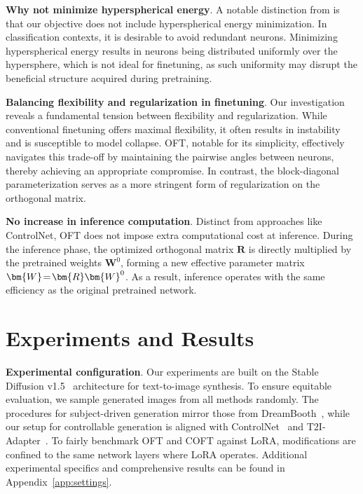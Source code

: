 \textbf{Why not minimize hyperspherical energy}. A notable distinction from \cite{liu2021orthogonal} is that our objective does not include hyperspherical energy minimization. In classification contexts, it is desirable to avoid redundant neurons. Minimizing hyperspherical energy results in neurons being distributed uniformly over the hypersphere, which is not ideal for finetuning, as such uniformity may disrupt the beneficial structure acquired during pretraining.

\textbf{Balancing flexibility and regularization in finetuning}. Our investigation reveals a fundamental tension between flexibility and regularization. While conventional finetuning offers maximal flexibility, it often results in instability and is susceptible to model collapse. OFT, notable for its simplicity, effectively navigates this trade-off by maintaining the pairwise angles between neurons, thereby achieving an appropriate compromise. In contrast, the block-diagonal parameterization serves as a more stringent form of regularization on the orthogonal matrix.

\textbf{No increase in inference computation}. Distinct from approaches like ControlNet, OFT does not impose extra computational cost at inference. During the inference phase, the optimized orthogonal matrix $\bm{R}$ is directly multiplied by the pretrained weights $\bm{W}^0$, forming a new effective parameter matrix $\thickmuskip=2mu \medmuskip=2mu \bm{W}=\bm{R}\bm{W}^0$. As a result, inference operates with the same efficiency as the original pretrained network.

\section{Experiments and Results}

\textbf{Experimental configuration}. Our experiments are built on the Stable Diffusion v1.5~\cite{rombach2022high} architecture for text-to-image synthesis. To ensure equitable evaluation, we sample generated images from all methods randomly. The procedures for subject-driven generation mirror those from DreamBooth~\cite{ruiz2023dreambooth}, while our setup for controllable generation is aligned with ControlNet~\cite{zhang2023adding} and T2I-Adapter~\cite{mou2023t2i}. To fairly benchmark OFT and COFT against LoRA, modifications are confined to the same network layers where LoRA operates. Additional experimental specifics and comprehensive results can be found in Appendix~\ref{app:settings}.

